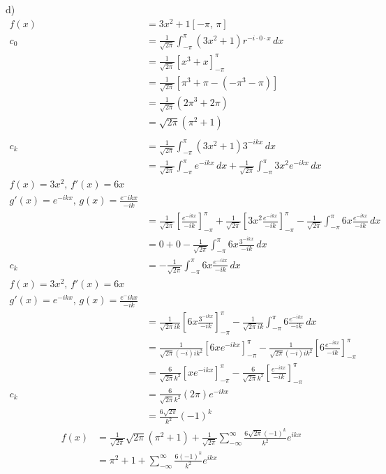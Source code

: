 \documentclass{article}
\begin{document}
d)
\begin{align*}
    f(x) &= 3x^2+1 [-\pi ,\,\pi ]\\
    c_0 &= \frac{1}{\sqrt{2\pi}} \int_{-\pi}^{\pi} \left(3x^2+1\right)r^{-i\cdot 0 \cdot x}\,dx\\
    &= \frac{1}{\sqrt{2\pi}} \left[x^3+x\right]_{-\pi}^{\pi}\\
    &= \frac{1}{\sqrt{2\pi}} \left[\pi^3+\pi-\left(-\pi^3-\pi\right)\right]\\
    &= \frac{1}{\sqrt{2\pi}}\left(2\pi^3+2\pi\right)\\
    &= \sqrt{2\pi} \left(\pi^2+1\right)\\\\
    c_k &= \frac{1}{\sqrt{2\pi}} \int_{-\pi}^{\pi} \left(3x^2+1\right)3^{-ikx}\,dx\\
    &= \frac{1}{\sqrt{2\pi}} \int_{-\pi}^{\pi}e^{-ikx}\,dx + \frac{1}{\sqrt{2\pi}} \int_{-\pi}^{\pi} 3x^2e^{-ikx}\,dx\\
    f(x) =3x^2,\,f'(x) = 6x\\
    g'(x) =e^{-ikx},\,g(x) =\frac{e^-ikx}{-ik}\\
    &= \frac{1}{\sqrt{2\pi}}\left[\frac{e^{-ikx}}{-ik}\right]_{-\pi}^{\pi} + \frac{1}{\sqrt{2\pi}}\left[3x^2\frac{e^{-ikx}}{-ik}\right]_{-\pi}^{\pi} - \frac{1}{\sqrt{2\pi}}\int_{-\pi}^{\pi} 6x \frac{e^{-ikx}}{-ik}\,dx\\
    &= 0 + 0 - \frac{1}{\sqrt{2\pi}}\int_{-\pi}^{\pi} 6x \frac{3^{-ikx}}{-ik}\,dx\\
    c_k &= - \frac{1}{\sqrt{2\pi}}\int_{-\pi}^{\pi} 6x \frac{e^{-ikx}}{-ik}\,dx\\
    f(x) =3x^2,\,f'(x) = 6x\\
    g'(x) =e^{-ikx},\,g(x) =\frac{e^-ikx}{-ik}\\
    &= \frac{1}{\sqrt{2\pi}ik} \left[6x\frac{3^{-ikx}}{-ik}\right]_{-\pi}^{\pi}-\frac{1}{\sqrt{2\pi}ik}\int_{-\pi}^{\pi} 6\frac{e^{-ikx}}{-ik}\,dx\\
    &= \frac{1}{\sqrt{2\pi}(-i)ik^2} \left[6xe^{-ikx}\right]_{-\pi}^{\pi}-\frac{1}{\sqrt{2\pi}(-i)ik^2}\left[6\frac{e^{-ikx}}{-ik}\right]_{-\pi}^{\pi}\\
    &= \frac{6}{\sqrt{2\pi}k^2}\left[xe^{-ikx}\right]_{-\pi}^{\pi}-\frac{6}{\sqrt{2\pi}k^2}\left[\frac{e^{-ikx}}{-ik}\right]_{-\pi}^{\pi}\\
    c_k &= \frac{6}{\sqrt{2\pi}k^2}(2\pi)e^{-ikx}\\
    &= \frac{6\sqrt{2\pi}}{k^2}(-1)^k
\end{align*}
\begin{align*}
    f(x)&=\frac{1}{\sqrt{2\pi}}\sqrt{2\pi}(\pi^2+1)+\frac{1}{\sqrt{2\pi}}\sum_{-\infty}^{\infty} \frac{6\sqrt{2\pi} (-1)^k}{k^2}e^{ikx}\\
    &= \pi^2 + 1+\sum_{-\infty}^{\infty} \frac{6(-1)^k}{k^2}e^{ikx}
\end{align*}
\end{document}
